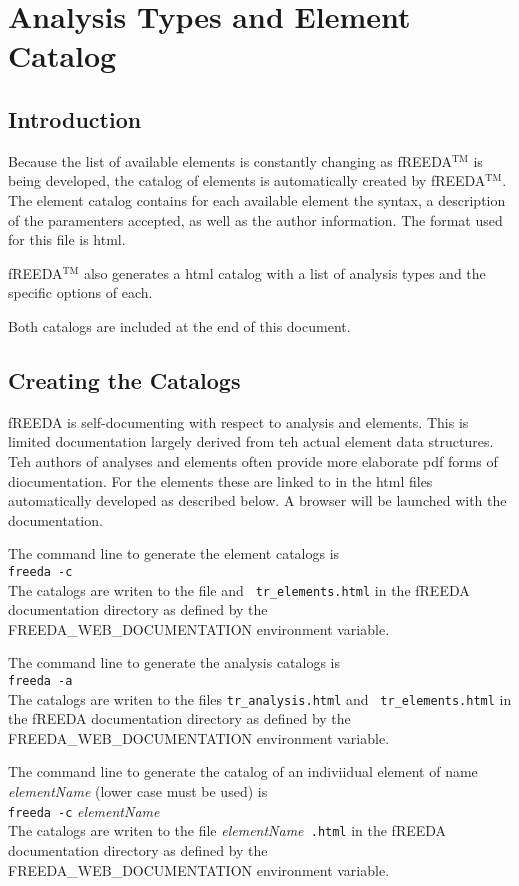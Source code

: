 
\chapter{Analysis Types and Element Catalog}

\section{Introduction}

Because the list of available elements is constantly changing as
fREEDA$^{\mathrm{TM}}$ is being developed, the catalog of elements is automatically
created by fREEDA$^{\mathrm{TM}}$. The element catalog contains for each available
element the syntax, a description of the paramenters accepted, as well
as the author information. The format used for this file is html.

fREEDA$^{\mathrm{TM}}$ also generates a html catalog with a list of analysis types
and the specific options of each.

Both catalogs are included at the end of this document.


\section{Creating the Catalogs}

fREEDA is self-documenting with respect to analysis and elements.  This is limited documentation largely derived from teh actual element data structures.  Teh authors of analyses and elements often provide more elaborate pdf forms of diocumentation. For the elements these are linked to in the html files automatically developed as described below.  A browser will be launched with the documentation.

The command line to generate the element catalogs is \medskip \\
{\tt freeda -c} \medskip \\
The catalogs are writen to the file and {\tt
tr\_elements.html} in the fREEDA documentation directory as
defined by the FREEDA_WEB_DOCUMENTATION environment variable.

The command line to generate the analysis catalogs is \medskip \\
{\tt freeda -a} \medskip \\
The catalogs are writen to the files {\tt tr\_analysis.html} and {\tt
tr\_elements.html} in the fREEDA documentation directory as defined by the FREEDA_WEB_DOCUMENTATION environment variable.

The command line to generate the catalog of an indiviidual element of name {\em elementName} (lower case must be used) is \medskip \\

{\tt freeda -c} {\em elementName} \medskip \\
The catalogs are writen to the file  {\em elementName}{\tt
.html} in the fREEDA documentation directory as
defined by the FREEDA_WEB_DOCUMENTATION environment variable.

